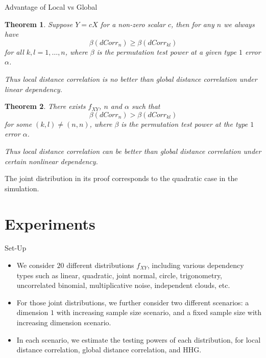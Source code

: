 \documentclass{beamer}
\newtheorem{thm}{Theorem}
\begin{document}
\begin{frame}{Advantage of Local vs Global}
\begin{thm}
\label{thm2}
Suppose $Y=cX$ for a non-zero scalar $c$, then for any $n$ we always have
\begin{equation}
\label{equ1}
\beta(dCorr_{n}) \geq \beta(dCorr_{kl})
\end{equation}
for all $k,l=1,\ldots,n$, where $\beta$ is the permutation test power at a given type $1$ error $\alpha$.

Thus local distance correlation is no better than global distance correlation under linear dependency.
\end{thm}
\end{frame}

\begin{frame}
\begin{thm}
\label{thm3}
There exists $f_{XY}$, $n$ and $\alpha$ such that 
\begin{equation}
\label{equ2}
\beta(dCorr_{n}) > \beta(dCorr_{kl})
\end{equation}
for some $(k,l) \neq (n,n)$, where $\beta$ is the permutation test power at the type $1$ error $\alpha$.

Thus local distance correlation can be better than global distance correlation under certain nonlinear dependency.
\end{thm}

The joint distribution in its proof corresponds to the quadratic case in the simulation.
\end{frame}

\section{Experiments}
\begin{frame}{Set-Up}
\begin{itemize}[<+->]
\item We consider $20$ different distributions $f_{XY}$, including various dependency types such as linear, quadratic, joint normal, circle, trigonometry, uncorrelated binomial, multiplicative noise, independent clouds, etc.
\item For those joint distributions, we further consider two different scenarios: a dimension $1$ with increasing sample size scenario, and a fixed sample size with increasing dimension scenario.
\item In each scenario, we estimate the testing powers of each distribution, for local distance correlation, global distance correlation, and HHG. 
\end{itemize}
\end{frame}
\end{document}
